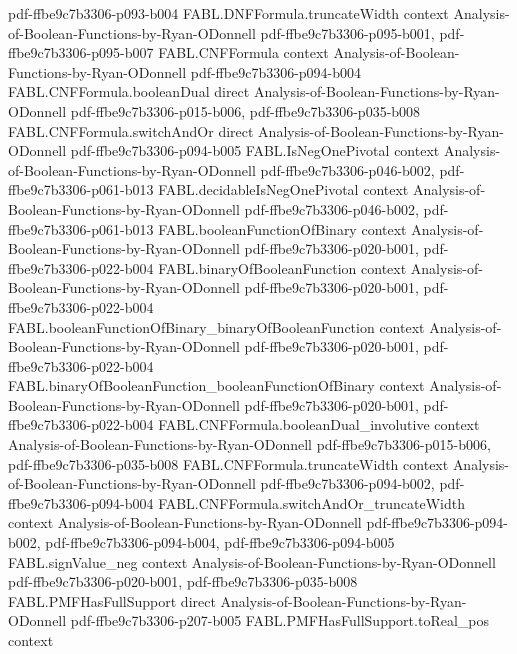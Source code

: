 \begin{theorem}
  {pdf-ffbe9c7b3306-p093-b004}
\proofstep
  {FABL.DNFFormula.truncateWidth}
  {context}
  {Analysis-of-Boolean-Functions-by-Ryan-ODonnell}
  {pdf-ffbe9c7b3306-p095-b001,
    pdf-ffbe9c7b3306-p095-b007}
\proofstep
  {FABL.CNFFormula}
  {context}
  {Analysis-of-Boolean-Functions-by-Ryan-ODonnell}
  {pdf-ffbe9c7b3306-p094-b004}
\proofstep
  {FABL.CNFFormula.booleanDual}
  {direct}
  {Analysis-of-Boolean-Functions-by-Ryan-ODonnell}
  {pdf-ffbe9c7b3306-p015-b006,
    pdf-ffbe9c7b3306-p035-b008}
\proofstep
  {FABL.CNFFormula.switchAndOr}
  {direct}
  {Analysis-of-Boolean-Functions-by-Ryan-ODonnell}
  {pdf-ffbe9c7b3306-p094-b005}
\proofstep
  {FABL.IsNegOnePivotal}
  {context}
  {Analysis-of-Boolean-Functions-by-Ryan-ODonnell}
  {pdf-ffbe9c7b3306-p046-b002,
    pdf-ffbe9c7b3306-p061-b013}
\proofstep
  {FABL.decidableIsNegOnePivotal}
  {context}
  {Analysis-of-Boolean-Functions-by-Ryan-ODonnell}
  {pdf-ffbe9c7b3306-p046-b002,
    pdf-ffbe9c7b3306-p061-b013}
\proofstep
  {FABL.booleanFunctionOfBinary}
  {context}
  {Analysis-of-Boolean-Functions-by-Ryan-ODonnell}
  {pdf-ffbe9c7b3306-p020-b001,
    pdf-ffbe9c7b3306-p022-b004}
\proofstep
  {FABL.binaryOfBooleanFunction}
  {context}
  {Analysis-of-Boolean-Functions-by-Ryan-ODonnell}
  {pdf-ffbe9c7b3306-p020-b001,
    pdf-ffbe9c7b3306-p022-b004}
\proofstep
  {FABL.booleanFunctionOfBinary_binaryOfBooleanFunction}
  {context}
  {Analysis-of-Boolean-Functions-by-Ryan-ODonnell}
  {pdf-ffbe9c7b3306-p020-b001,
    pdf-ffbe9c7b3306-p022-b004}
\proofstep
  {FABL.binaryOfBooleanFunction_booleanFunctionOfBinary}
  {context}
  {Analysis-of-Boolean-Functions-by-Ryan-ODonnell}
  {pdf-ffbe9c7b3306-p020-b001,
    pdf-ffbe9c7b3306-p022-b004}
\proofstep
  {FABL.CNFFormula.booleanDual_involutive}
  {context}
  {Analysis-of-Boolean-Functions-by-Ryan-ODonnell}
  {pdf-ffbe9c7b3306-p015-b006,
    pdf-ffbe9c7b3306-p035-b008}
\proofstep
  {FABL.CNFFormula.truncateWidth}
  {context}
  {Analysis-of-Boolean-Functions-by-Ryan-ODonnell}
  {pdf-ffbe9c7b3306-p094-b002,
    pdf-ffbe9c7b3306-p094-b004}
\proofstep
  {FABL.CNFFormula.switchAndOr_truncateWidth}
  {context}
  {Analysis-of-Boolean-Functions-by-Ryan-ODonnell}
  {pdf-ffbe9c7b3306-p094-b002,
    pdf-ffbe9c7b3306-p094-b004,
    pdf-ffbe9c7b3306-p094-b005}
\proofstep
  {FABL.signValue_neg}
  {context}
  {Analysis-of-Boolean-Functions-by-Ryan-ODonnell}
  {pdf-ffbe9c7b3306-p020-b001,
    pdf-ffbe9c7b3306-p035-b008}
\proofstep
  {FABL.PMFHasFullSupport}
  {direct}
  {Analysis-of-Boolean-Functions-by-Ryan-ODonnell}
  {pdf-ffbe9c7b3306-p207-b005}
\proofstep
  {FABL.PMFHasFullSupport.toReal_pos}
  {context}

\end{theorem}
